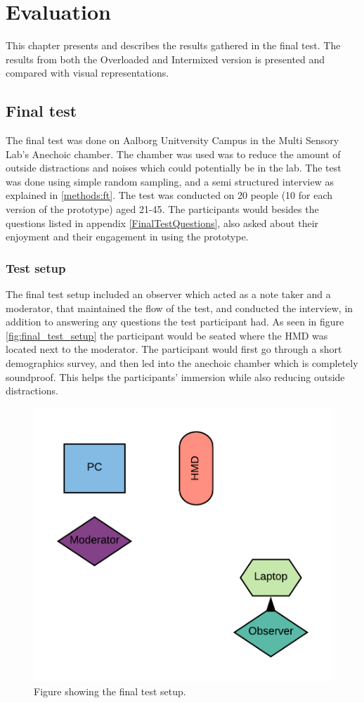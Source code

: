 \chapter{Evaluation}
This chapter presents and describes the results gathered in the final test. The results from both the Overloaded and Intermixed version is presented and compared with visual representations.

\section{Final test}
The final test was done on Aalborg Unitversity Campus in the Multi Sensory Lab's Anechoic chamber. The chamber was used was to reduce the amount of outside distractions and noises which could potentially be in the lab. The test was done using simple random sampling, and a semi structured interview as explained in \autoref{methods:ft}. The test was conducted on 20 people (10 for each version of the prototype) aged 21-45. The participants would besides the questions listed in appendix \ref{FinalTestQuestions}, also asked about their enjoyment and their engagement in using the prototype.
    
\subsection{Test setup}
    The final test setup included an observer which acted as a note taker and a moderator, that maintained the flow of the test, and conducted the interview, in addition to answering any questions the test participant had. As seen in figure \autoref{fig:final_test_setup} the participant would be seated where the HMD was located next to the moderator. The participant would first go through a short demographics survey, and then led into the anechoic chamber which is completely soundproof. This helps the participants' immersion while also reducing outside distractions.
    
    \begin{figure}[H]
        \centering
        \includegraphics[width=0.6\linewidth]{figure/Evaluation/FinalTestSetup.png}
        \caption{Figure showing the final test setup.}
        \label{fig:final_test_setup}
    \end{figure}
    

